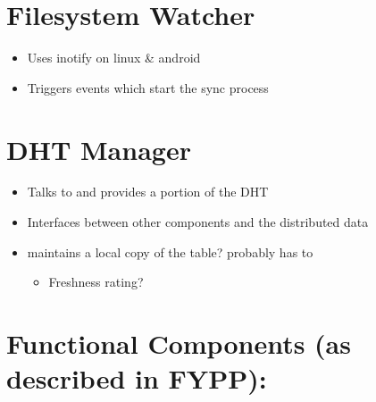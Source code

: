 \documentclass[12pt,a4paper,]{adreport}
\begin{document}
\section{Filesystem Watcher}\label{filesystem-watcher}

\begin{itemize}
\itemsep1pt\parskip0pt
\item
  Uses inotify on linux \& android
\item
  Triggers events which start the sync process
\end{itemize}

\section{DHT Manager}\label{dht-manager}

\begin{itemize}
\itemsep1pt\parskip0pt
\item
  Talks to and provides a portion of the DHT
\item
  Interfaces between other components and the distributed data
\item
  maintains a local copy of the table? probably has to

  \begin{itemize}
  \itemsep1pt\parskip0pt
  \item
    Freshness rating?
  \end{itemize}
\end{itemize}

\section{Functional Components (as described in
FYPP):}\label{functional-components-as-described-in-fypp}
\end{document}
